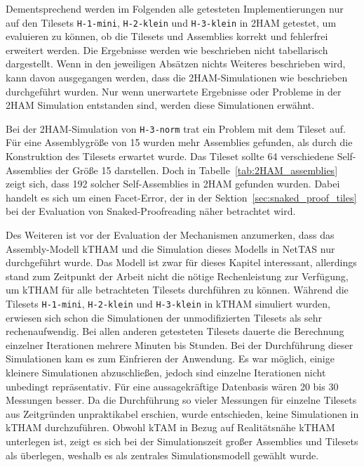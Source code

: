Dementsprechend werden im Folgenden alle getesteten Implementierungen nur auf den Tilesets \texttt{H-1-mini}, \texttt{H-2-klein} und \texttt{H-3-klein} in 2HAM getestet, um evaluieren zu können, ob die Tilesets und Assemblies korrekt und fehlerfrei erweitert werden. Die Ergebnisse werden wie beschrieben nicht tabellarisch dargestellt. Wenn in den jeweiligen Absätzen nichts Weiteres beschrieben wird, kann davon ausgegangen werden, dass die 2HAM-Simulationen wie beschrieben durchgeführt wurden. Nur wenn unerwartete Ergebnisse oder Probleme in der 2HAM Simulation entstanden sind, werden diese Simulationen erwähnt. 

Bei der 2HAM-Simulation von \texttt{H-3-norm} trat ein Problem mit dem Tileset auf. Für eine Assemblygröße von 15 wurden mehr Assemblies gefunden, als durch die Konstruktion des Tilesets erwartet wurde. Das Tileset sollte 64 verschiedene Self-Assemblies der Größe 15 darstellen. Doch in Tabelle~\ref{tab:2HAM_assemblies} zeigt sich, dass 192 solcher Self-Assemblies in 2HAM gefunden wurden. Dabei handelt es sich um einen Facet-Error, der in der Sektion~\ref{sec:snaked_proof_tiles} bei der Evaluation von Snaked-Proofreading näher betrachtet wird.

Des Weiteren ist vor der Evaluation der Mechanismen anzumerken, dass das Assembly-Modell kTHAM und die Simulation dieses Modells in NetTAS nur durchgeführt wurde. Das Modell ist zwar für dieses Kapitel interessant, allerdings stand zum Zeitpunkt der Arbeit nicht die nötige Rechenleistung zur Verfügung, um kTHAM für alle betrachteten Tilesets durchführen zu können. Während die Tilesets \texttt{H-1-mini}, \texttt{H-2-klein} und \texttt{H-3-klein} in kTHAM simuliert wurden, erwiesen sich schon die Simulationen der unmodifizierten Tilesets als sehr rechenaufwendig. Bei allen anderen getesteten Tilesets dauerte die Berechnung einzelner Iterationen mehrere Minuten bis Stunden. Bei der Durchführung dieser Simulationen kam es zum Einfrieren der Anwendung. Es war möglich, einige kleinere Simulationen abzuschließen, jedoch sind einzelne Iterationen nicht unbedingt repräsentativ. Für eine aussagekräftige Datenbasis wären 20 bis 30 Messungen besser. Da die Durchführung so vieler Messungen für einzelne Tilesets aus Zeitgründen unpraktikabel erschien, wurde entschieden, keine Simulationen in kTHAM durchzuführen. Obwohl kTAM in Bezug auf Realitätsnähe kTHAM unterlegen ist, zeigt es sich bei der Simulationszeit großer Assemblies und Tilesets als überlegen, weshalb es als zentrales Simulationsmodell gewählt wurde.

